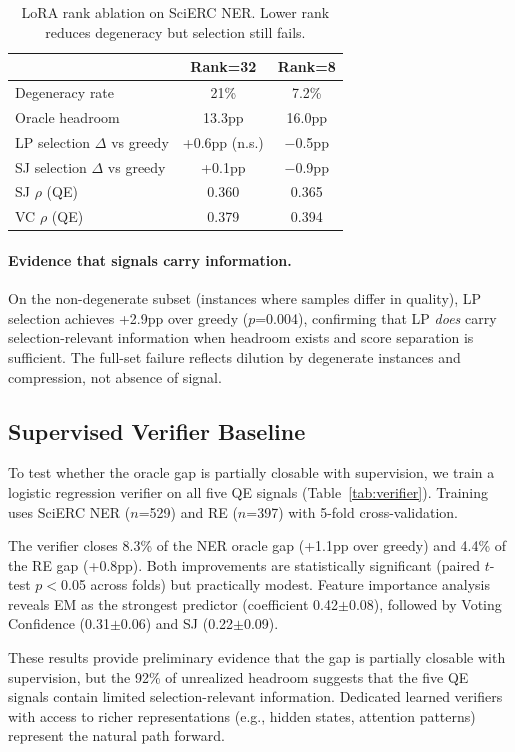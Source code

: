 \documentclass[11pt,a4paper]{article}
\begin{document}
\begin{table}[t]
\centering
\small
\caption{LoRA rank ablation on SciERC NER. Lower rank reduces degeneracy but selection still fails.}
\label{tab:lora}
\begin{tabular}{@{}l cc@{}}
\toprule
& Rank=32 & Rank=8 \\
\midrule
Degeneracy rate & 21\% & 7.2\% \\
Oracle headroom & 13.3pp & 16.0pp \\
LP selection $\Delta$ vs greedy & +0.6pp (n.s.) & $-$0.5pp \\
SJ selection $\Delta$ vs greedy & +0.1pp & $-$0.9pp \\
SJ $\rho$ (QE) & 0.360 & 0.365 \\
VC $\rho$ (QE) & 0.379 & 0.394 \\
\bottomrule
\end{tabular}
\end{table}

\paragraph{Evidence that signals carry information.}
On the non-degenerate subset (instances where samples differ in quality), LP selection achieves +2.9pp over greedy ($p$=0.004), confirming that LP \emph{does} carry selection-relevant information when headroom exists and score separation is sufficient.
The full-set failure reflects dilution by degenerate instances and compression, not absence of signal.

\subsection{Supervised Verifier Baseline}
\label{sec:verifier}

To test whether the oracle gap is partially closable with supervision, we train a logistic regression verifier on all five QE signals (Table~\ref{tab:verifier}).
Training uses SciERC NER ($n$=529) and RE ($n$=397) with 5-fold cross-validation.

The verifier closes 8.3\% of the NER oracle gap (+1.1pp over greedy) and 4.4\% of the RE gap (+0.8pp).
Both improvements are statistically significant (paired $t$-test $p<$0.05 across folds) but practically modest.
Feature importance analysis reveals EM as the strongest predictor (coefficient 0.42$\pm$0.08), followed by Voting Confidence (0.31$\pm$0.06) and SJ (0.22$\pm$0.09).

These results provide preliminary evidence that the gap is partially closable with supervision, but the 92\% of unrealized headroom suggests that the five QE signals contain limited selection-relevant information.
Dedicated learned verifiers with access to richer representations (e.g., hidden states, attention patterns) represent the natural path forward.
\end{document}
